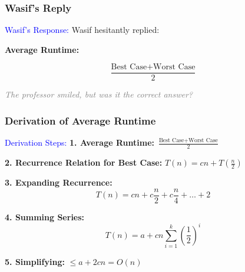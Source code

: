 \begin{frame}
    \frametitle{Wasif's Reply}
    \vspace{0.4cm} %

    \begin{block}{\textcolor{blue}{Wasif's Response:}}
        Wasif hesitantly replied:
        \vspace{0.4cm}

            \textbf{Average Runtime:} \quad 
        \begin{center}
            \[
            \frac{\text{Best Case} + \text{Worst Case}}{2}
            \]
        \end{center}
    \end{block}

    \vspace{0.6cm} %
    \begin{center}
        \textit{\textcolor{gray}{The professor smiled, but was it the correct answer?}}
    \end{center}
\end{frame}


\begin{frame}
    \frametitle{Derivation of Average Runtime}
    \vspace{0.4cm}

    \begin{block}{\textcolor{blue}{Derivation Steps:}}
        \textbf{1. Average Runtime:} \( \frac{\text{Best Case} + \text{Worst Case}}{2} \)

        \vspace{0.3cm}
        \textbf{2. Recurrence Relation for Best Case:} \( T(n) = cn + T\left(\frac{n}{2}\right) \)

        \vspace{0.3cm}
        \textbf{3. Expanding Recurrence:}
        \[
        T(n) = cn + c\frac{n}{2} + c\frac{n}{4} + \dots + 2
        \]

        \vspace{0.3cm}
        \textbf{4. Summing Series:}
        \[
        T(n) = a + cn \sum_{i=1}^k \left(\frac{1}{2}\right)^i
        \]

        \vspace{0.3cm}
        \textbf{5. Simplifying:} \( \leq a + 2cn = O(n) \)
    \end{block}

\end{frame}

